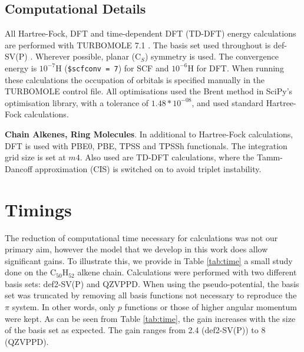 \documentclass[12pt]{article}
\begin{document}


\subsection*{\sffamily \large Computational Details}

All Hartree-Fock, DFT and time-dependent DFT (TD-DFT) energy calculations are performed with TURBOMOLE 7.1 \cite{TURBOMOLE}. The basis set used throughout is def-SV(P) \cite{defsvp}. Wherever possible, planar (C\(_{S}\)) symmetry is used. The convergence energy is \(10^{-7}\)H (\texttt{\$scfconv = 7}) for SCF and \(10^{-6}\)H for DFT. When running these calculations the occupation of orbitals is specified manually in the TURBOMOLE control file. All optimisations used the Brent method in SciPy's optimisation library, with a tolerance of \(1.48*10^{-08}\), and used standard Hartree-Fock calculations.\cite{scipy}

\textbf{Chain Alkenes, Ring Molecules}. In additional to Hartree-Fock calculations, DFT is used with PBE0, PBE, TPSS and TPSSh functionals. \cite{pbe0,pbe,tpss,tpssh} The integration grid size is set at \(m4\). Also used are TD-DFT calculations, where the Tamm-Dancoff approximation (CIS) \cite{tammdancoff} is switched on to avoid triplet instability.

\section*{Timings}
The reduction of computational time necessary for calculations was not our primary aim, however the model that we develop in this work does allow significant gains.
To illustrate this, we provide in Table \ref{tab:time} a small study done on the C$_{50}$H$_{52}$
alkene chain.
Calculations were performed with two different basis sets: def2-SV(P) and QZVPPD.
When using the pseudo-potential, the basis set was truncated by removing all
basis functions not necessary to reproduce the
$\pi$ system.
In other words, only $p$ functions or those of higher angular momentum were kept.
As can be seen from Table \ref{tab:time}, the gain increases
with the size of the basis set as expected.
The gain ranges from 2.4 (def2-SV(P)) to 8 (QZVPPD).
\end{document}
